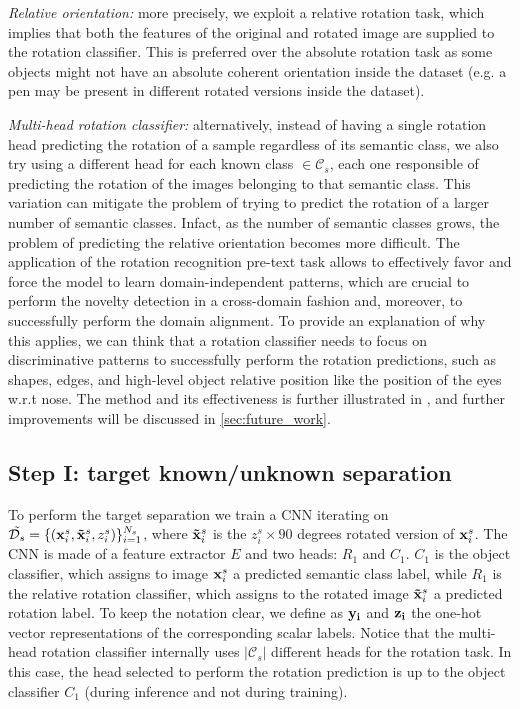 \documentclass[10pt,twocolumn,letterpaper]{article}
\begin{document}
{\it Relative orientation:}
more precisely, we exploit a relative rotation task,
which implies that both the features of the original and rotated image are supplied to the rotation classifier.
This is preferred over the absolute rotation task as some objects might not have an absolute coherent orientation
inside the dataset
(e.g. a pen may be present in different rotated versions inside the dataset). 

{\it Multi-head rotation classifier:}
alternatively, 
instead of having a single rotation head predicting the rotation of a sample regardless of its semantic class, 
we also try using a different head for each known class $\in \mathcal{C}_s$, each one responsible of predicting the rotation
of the images belonging to that semantic class.
This variation can mitigate the problem of trying to predict the rotation of a larger number
of semantic classes. Infact, as the number of semantic classes grows,
the problem of predicting the relative orientation becomes more difficult.
The application of the rotation recognition pre-text task allows to effectively favor and force the model to learn
domain-independent patterns, which are crucial to perform the novelty detection in a cross-domain fashion and, moreover,
to successfully perform the domain alignment.
To provide an explanation of why this applies, we can think that a rotation classifier needs to focus on discriminative patterns to
successfully perform the rotation predictions, such as shapes, edges, and high-level object relative position like the position of the eyes
w.r.t nose.
The method and its effectiveness is further illustrated in \cite{OldROS},
and further improvements will be discussed in \ref{sec:future_work}.

\subsection{Step I: target known/unknown separation}
\label{sec:stepone}

To perform the target separation we train a CNN iterating on $\tilde{\mathcal{D}_s} = \{({\bf x}_i^s, {\bf \tilde x}_i^s, z_i^s)\}_{i=1}^{N_s}$,
where ${\bf \tilde x}_i^s$ is the $z_i^s\times 90$ degrees rotated version of ${\bf x}_i^s$.
The CNN is made of a feature extractor $E$ and two heads: $R_1$ and $C_1$.
$C_1$ is the object classifier, which assigns to image ${\bf x}_i^s$ a predicted semantic class label,
while $R_1$ is the relative rotation classifier, which assigns to the rotated image ${\bf \tilde x}_i^s$ a predicted rotation label.
To keep the notation clear, we define as ${\bf y_i}$ and ${\bf z_i}$ the one-hot vector representations of the corresponding scalar labels.
Notice that the multi-head rotation classifier internally uses $|\mathcal{C}_s|$ different heads for the rotation task.
In this case, the head selected to perform the rotation prediction is up to the object classifier $C_1$ (during inference and not during training). 
\end{document}
